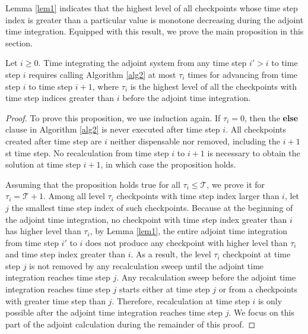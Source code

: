 Lemma \ref{lem1} indicates that the highest level of all checkpoints whose
time step index is greater than a particular value is monotone decreasing
during the adjoint time integration.  Equipped with this result, we prove the
main proposition in this section.

\begin{proposition} \label{thm2}
    Let $i \ge 0$.  Time integrating the adjoint system from any time
    step $i' > i$ to time step $i$ requires calling Algorithm \ref{alg2} at
    most $\tau_i$ times for advancing from time step $i$ to time step $i + 1$,
    where $\tau_i$ is the highest level of all the checkpoints with time step
    indices greater than $i$ before the adjoint time integration.
\end{proposition}
\begin{proof}
To prove this proposition, we use induction again.
If $\tau_i = 0$, then the \textbf{else} clause in Algorithm \ref{alg2} is
never executed after time step $i$.  All checkpoints created after time step
are $i$ neither dispensable nor removed, including the $i + 1$st time step.
No recalculation from time step $i$ to $i + 1$ is necessary to obtain the
solution at time step $i + 1$, in which case the proposition holds.

Assuming that the proposition holds true for all $\tau_i \le \mathcal{T}$, we
prove it for $\tau_i = \mathcal{T} + 1$.  Among all level
$\tau_i$ checkpoints with time step index larger than $i$, let $j$ the smallest
time step index of such checkpoints.  Because at the beginning of the adjoint
time integration, no checkpoint with time step index greater than $i$ has
higher level
than $\tau_i$, by Lemma \ref{lem1}, the entire adjoint time integration from
time step $i'$ to $i$ does not produce any checkpoint with higher level than
$\tau_i$ and time step index greater than $i$.  As a result, the level $\tau_i$
checkpoint at time step $j$ is not removed by any recalculation sweep until
the adjoint time integration reaches time step $j$.
Any recalculation sweep before the adjoint time integration reaches time step
$j$ starts either at time step $j$ or from a checkpoints with greater time
step than $j$.  Therefore, recalculation at time step $i$ is only possible
after the adjoint time integration reaches time step $j$.  We focus on this
part of the adjoint calculation during the remainder of this proof.


\end{proof}
